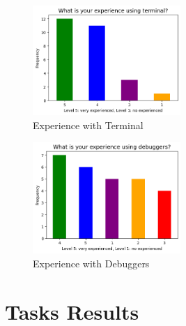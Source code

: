 \begin{figure}[h]
    \centering
    \includegraphics[width=0.5\textwidth]{figures/experience-terminal.png}
    \caption{Experience with Terminal}
    \label{fig:exp-terminal}
\end{figure}

\begin{figure}[h]
    \centering
    \includegraphics[width=0.5\textwidth]{figures/experience-debuggers.png}
    \caption{Experience with Debuggers}
    \label{fig:exp-deb}
\end{figure}

\section{Tasks Results}
\label{sec:tasks-results}

